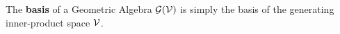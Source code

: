\begin{definition}[Basis]\label{d:basis}
	The \textbf{basis} of a Geometric Algebra $\mathcal{G}(\mathcal{V})$ is simply the basis of the generating inner-product space $\mathcal{V}$.
\end{definition}
